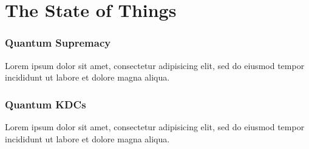 \documentclass[aspectratio=169]{beamer} %
\begin{document}
\section{The State of Things}

\begin{frame}
    \frametitle{Quantum Supremacy}
    Lorem ipsum dolor sit amet, consectetur adipisicing elit, sed do eiusmod tempor incididunt ut labore et dolore magna aliqua.
\end{frame}

\begin{frame}
\frametitle{Quantum KDCs}
Lorem ipsum dolor sit amet, consectetur adipisicing elit, sed do eiusmod tempor incididunt ut labore et dolore magna aliqua.
\end{frame}

\end{document}

